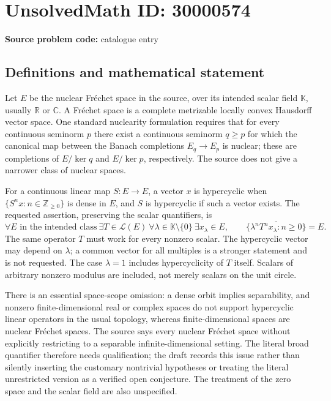 \documentclass[11pt]{article}
\newcommand{\Z}{\mathbb{Z}}
\newcommand{\R}{\mathbb{R}}
\newcommand{\C}{\mathbb{C}}
\begin{document}
\section*{UnsolvedMath ID: 30000574}
\textbf{Source problem code:} catalogue entry
\subsection{Definitions and mathematical statement}
Let \(E\) be the nuclear Fr\'echet space in the source, over its intended scalar field \(\mathbb K\), usually \(\R\) or \(\C\). A Fr\'echet space is a complete metrizable locally convex Hausdorff vector space. One standard nuclearity formulation requires that for every continuous seminorm \(p\) there exist a continuous seminorm \(q\geq p\) for which the canonical map between the Banach completions \(E_q\to E_p\) is nuclear; these are completions of \(E/\ker q\) and \(E/\ker p\), respectively. The source does not give a narrower class of nuclear spaces.

For a continuous linear map \(S:E\to E\), a vector \(x\) is hypercyclic when \(\{S^nx:n\in\Z_{\geq0}\}\) is dense in \(E\), and \(S\) is hypercyclic if such a vector exists. The requested assertion, preserving the scalar quantifiers, is
\[
 \forall E\text{ in the intended class}\ \exists T\in\mathcal L(E)
 \ \forall\lambda\in\mathbb K\setminus\{0\}\ \exists x_\lambda\in E,
 \qquad
 \overline{\{\lambda^nT^nx_\lambda:n\geq0\}}=E.
\]
The same operator \(T\) must work for every nonzero scalar. The hypercyclic vector may depend on \(\lambda\); a common vector for all multiples is a stronger statement and is not requested. The case \(\lambda=1\) includes hypercyclicity of \(T\) itself. Scalars of arbitrary nonzero modulus are included, not merely scalars on the unit circle.

There is an essential space-scope omission: a dense orbit implies separability, and nonzero finite-dimensional real or complex spaces do not support hypercyclic linear operators in the usual topology, whereas finite-dimensional spaces are nuclear Fr\'echet spaces. The source says every nuclear Fr\'echet space without explicitly restricting to a separable infinite-dimensional setting. The literal broad quantifier therefore needs qualification; the draft records this issue rather than silently inserting the customary nontrivial hypotheses or treating the literal unrestricted version as a verified open conjecture. The treatment of the zero space and the scalar field are also unspecified.
\end{document}
